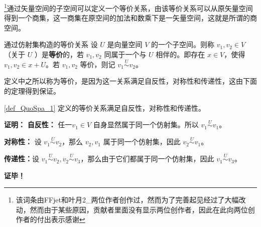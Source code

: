 







\footnote{该词条由FFjet和叶月2_两位作者创作过，然而为了完善起见经过了大幅改动，然而由于某些原因，贡献者里面没有显示两位创作者，因此在此向两位创作者的付出表示感谢}通过矢量空间的子空间可以定义一个等价关系，由该等价关系可以从原矢量空间得到一个商集，这一商集在原空间的加法和数乘下是一矢量空间，这就是所谓的商空间。


\begin{definition}{通过仿射集构造的等价关系}\label{def_QuoSpa_1}
设 $U$ 是向量空间 $V$ 的一个子空间。则称 $v_1,v_2\in V$ （关于 $U$ ）是\textbf{等价}的，若 $v_1,v_2$ 同属于一个与 $U$ 相伴的。即存在 $x\in V$，使得 $v_1,v_2\in x+U$。若 $v_1,v_2$ 等价，则记 $v_1\overset{U}{\sim}v_2$。 
\end{definition}
定义中之所以称为等价，是因为这一关系满足自反性，对称性和传递性，这由下面的定理得到保证。
\begin{theorem}{}
\autoref{def_QuoSpa_1} 定义的等价关系满足自反性，对称性和传递性。
\end{theorem}

\textbf{证明：}
\textbf{自反性：} 任一$v_1\in V$ 自身显然属于同一个仿射集。所以 $v_1\overset{U}{\sim} v_1$。

\textbf{对称性：} 设 $v_1\overset{U}{\sim} v_2$，那么 $v_2,v_1$ 属于同一个仿射集，因此 $v_2\overset{U}{\sim} v_1$。


\textbf{传递性：}设 $v_1\overset{U}{\sim} v_2,v_2\overset{U}{\sim} v_3$，那么由于它们都属于同一个仿射集，因此 $v_1\overset{U}{\sim} v_3$。

\textbf{证毕！}



